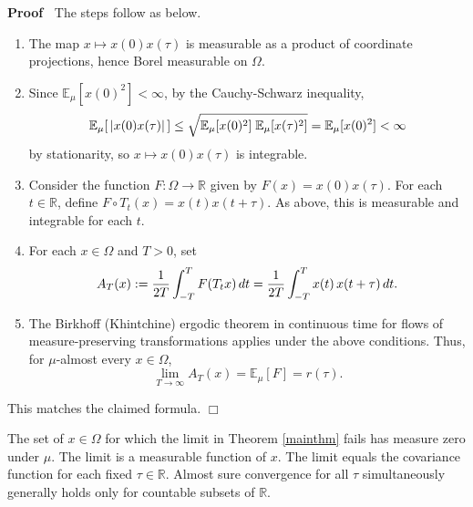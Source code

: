 \documentclass{article}
\newcommand{\assign}{:=}
\newenvironment{proof}{\noindent\textbf{Proof\ }}{\hspace*{\fill}$\Box$\medskip}
\begin{document}
\begin{proof}
  The steps follow as below.
  \begin{enumerate}
    \item The map $x \mapsto x (0) x (\tau)$ is measurable as a product of
    coordinate projections, hence Borel measurable on $\Omega$.
    
    \item Since $\mathbb{E}_{\mu} [x (0)^2] < \infty$, by the Cauchy-Schwarz
    inequality,
    \[ \mathbb{E}_{\mu} [\hspace{0.17em} |x (0) x (\tau) | \hspace{0.17em}]
       \leq \sqrt{\mathbb{E}_{\mu} [x (0)^2]  \hspace{0.27em} \mathbb{E}_{\mu}
       [x (\tau)^2]} =\mathbb{E}_{\mu} [x (0)^2] < \infty \]
    by stationarity, so $x \mapsto x (0) x (\tau)$ is integrable.
    
    \item Consider the function $F : \Omega \to \mathbb{R}$ given by $F (x) =
    x (0) x (\tau)$. For each $t \in \mathbb{R}$, define $F \circ T_t (x) = x
    (t) x (t + \tau)$. As above, this is measurable and integrable for each
    $t$.
    
    \item For each $x \in \Omega$ and $T > 0$, set
    \[ A_T (x) \assign \frac{1}{2 T}  \int_{- T}^T F (T_t x)  \hspace{0.17em}
       dt = \frac{1}{2 T}  \int_{- T}^T x (t)  \hspace{0.17em} x (t + \tau) 
       \hspace{0.17em} dt. \]
    \item The Birkhoff (Khintchine) ergodic theorem in continuous time for
    flows of measure-preserving transformations applies under the above
    conditions. Thus, for $\mu$-almost every $x \in \Omega$,
    \[ \lim_{T \to \infty} A_T (x) =\mathbb{E}_{\mu} [F] = r (\tau) . \]
  \end{enumerate}
  This matches the claimed formula.
\end{proof}

\begin{remark}
  The set of $x \in \Omega$ for which the limit in Theorem \ref{mainthm} fails
  has measure zero under $\mu$. The limit is a measurable function of $x$. The
  limit equals the covariance function for each fixed $\tau \in \mathbb{R}$.
  Almost sure convergence for all $\tau$ simultaneously generally holds only
  for countable subsets of $\mathbb{R}$.
\end{remark}
\end{document}
